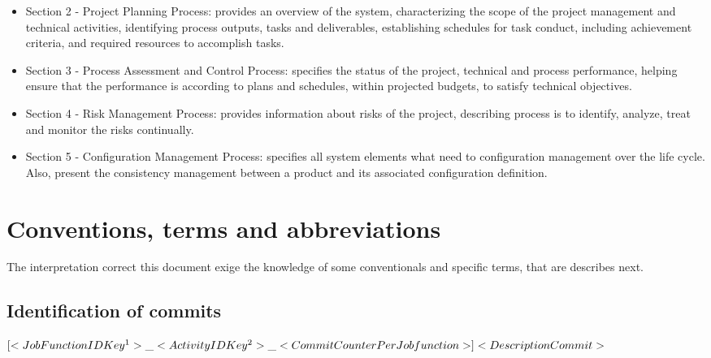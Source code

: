 \documentclass[11pt, twoside, a4paper]{book}
\begin{document}
                \begin{itemize}
                
                    \item Section 2 - Project Planning Process: provides an overview of the system, characterizing the scope of the project management and technical activities, identifying process outputs, tasks and deliverables, establishing schedules for task conduct, including achievement criteria, and required resources	 to	accomplish tasks.
                    
                    \item Section 3 - Process Assessment and Control Process: specifies the status of the project, technical and process performance, helping ensure that the performance is according to plans and schedules, within projected budgets, to satisfy technical objectives.
                                        
                    \item Section 4 - Risk Management Process: provides information about risks of the project, describing process is to identify, analyze, treat and	monitor	the	risks continually.

                    \item Section 5 - Configuration Management Process: specifies all system elements what need to configuration management over the life cycle. Also, present the consistency management between a product and its associated configuration definition.
                    
                \end{itemize}						
                
            \section{Conventions, terms and abbreviations}
                
                The interpretation correct this document exige the knowledge of some conventionals and specific terms, that are describes next.	                
                
                \subsection{Identification of commits}
                	
                	\begin{center}
                		$[<Job Function ID Key\footnote{See section 2.2 for more details}>\_<Activity ID Key\footnote{See section 2.1 for more details}>\_<Commit Counter Per Job function>] <Description Commit>$
                	\end{center}
                
\end{document}
